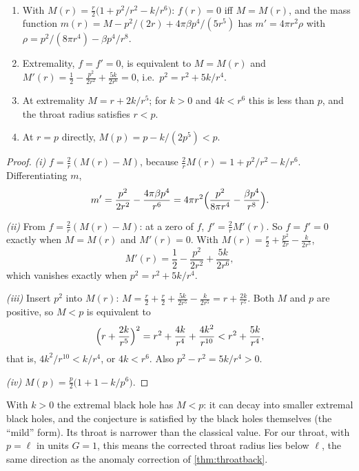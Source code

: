 \begin{theorem}\label{thm:lighter}\ver\
\begin{enumerate}[label=(\roman*)]
\item With $M(r)=\frac r2\bigl(1+p^2/r^2-k/r^6\bigr)$: $f(r)=0$ iff $M=M(r)$, and the mass function $m(r)=M-p^2/(2r)+4\pi\beta p^4/(5r^5)$ has $m'=4\pi r^2\rho$ with $\rho=p^2/(8\pi r^4)-\beta p^4/r^8$.
\item Extremality, $f=f'=0$, is equivalent to $M=M(r)$ and $M'(r)=\frac12-\frac{p^2}{2r^2}+\frac{5k}{2r^6}=0$, i.e.\ $p^2=r^2+5k/r^4$.
\item At extremality $M=r+2k/r^5$; for $k>0$ and $4k<r^6$ this is less than $p$, and the throat radius satisfies $r<p$.
\item At $r=p$ directly, $M(p)=p-k/(2p^5)<p$.
\end{enumerate}
\end{theorem}
\begin{proof}
\emph{(i)} $f=\frac2r(M(r)-M)$, because $\frac2rM(r)=1+p^2/r^2-k/r^6$. Differentiating $m$,
\[
m'=\frac{p^2}{2r^2}-\frac{4\pi\beta p^4}{r^6}=4\pi r^2\Bigl(\frac{p^2}{8\pi r^4}-\frac{\beta p^4}{r^8}\Bigr).
\]

\emph{(ii)} From $f=\frac2r(M(r)-M)$: at a zero of $f$, $f'=\frac2rM'(r)$. So $f=f'=0$ exactly when $M=M(r)$ and $M'(r)=0$. With $M(r)=\frac r2+\frac{p^2}{2r}-\frac k{2r^5}$,
\[
M'(r)=\frac12-\frac{p^2}{2r^2}+\frac{5k}{2r^6},
\]
which vanishes exactly when $p^2=r^2+5k/r^4$.

\emph{(iii)} Insert $p^2$ into $M(r)$: $M=\frac r2+\frac r2+\frac{5k}{2r^5}-\frac k{2r^5}=r+\frac{2k}{r^5}$. Both $M$ and $p$ are positive, so $M<p$ is equivalent to
\[
\Bigl(r+\frac{2k}{r^5}\Bigr)^2=r^2+\frac{4k}{r^4}+\frac{4k^2}{r^{10}}<r^2+\frac{5k}{r^4},
\]
that is, $4k^2/r^{10}<k/r^4$, or $4k<r^6$. Also $p^2-r^2=5k/r^4>0$.

\emph{(iv)} $M(p)=\frac p2\bigl(1+1-k/p^6\bigr)$.
\end{proof}


With $k>0$ the extremal black hole has $M<p$: it can decay into smaller extremal black holes, and the conjecture is satisfied by the black holes themselves (the ``mild'' form). Its throat is narrower than the classical value. For our throat, with $p=\ell$ in units $G=1$, this means the corrected throat radius lies below $\ell$, the same direction as the anomaly correction of \cref{thm:throatback}.

